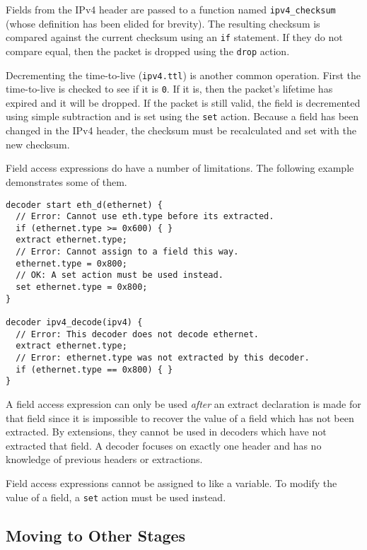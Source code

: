 Fields from the IPv4 header are passed to a function named 
\texttt{ipv4\_checksum} (whose definition has been elided for brevity). The 
resulting checksum is compared against the current checksum using an \texttt{if} 
statement. If they do not compare equal, then the packet is dropped using the 
\texttt{drop} action.

Decrementing the time-to-live (\texttt{ipv4.ttl}) is another common operation. 
First the time-to-live is checked to see if it is \texttt{0}. If it is, then the 
packet's lifetime has expired and it will be dropped. If the packet is still 
valid, the field is decremented using simple subtraction and is set using the 
\texttt{set} action. Because a field has been changed in the IPv4 
header, the checksum must be recalculated and set with the new checksum.

Field access expressions do have a number of limitations. The following example
demonstrates some of them.

\begin{codepage}
\begin{lstlisting}
decoder start eth_d(ethernet) {
  // Error: Cannot use eth.type before its extracted.
  if (ethernet.type >= 0x600) { }
  extract ethernet.type;
  // Error: Cannot assign to a field this way.
  ethernet.type = 0x800;
  // OK: A set action must be used instead.
  set ethernet.type = 0x800;
}

decoder ipv4_decode(ipv4) {
  // Error: This decoder does not decode ethernet.
  extract ethernet.type;
  // Error: ethernet.type was not extracted by this decoder.
  if (ethernet.type == 0x800) { }
}
\end{lstlisting}
\end{codepage}

A field access expression can only be used \textit{after} an extract declaration
is made for that field since it is impossible to recover the value of a
field which has not been extracted. By extensions, they cannot be used in
decoders which have not extracted that field. A decoder focuses on exactly one
header and has no knowledge of previous headers or extractions.

Field access expressions cannot be assigned to like a variable. To modify the
value of a field, a \texttt{set} action must be used instead.

\subsection{Moving to Other Stages} \label{tut:decoder_next}

